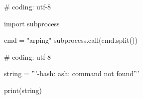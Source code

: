 \begin{mylisting}[label={lst:acpid},language=sh,caption=arping]
# coding: utf-8

import subprocess

cmd = "arping"
subprocess.call(cmd.split())

\end{mylisting}


\begin{mylisting}[label={lst:acpid},language=sh,caption=ash]
# coding: utf-8

string = '''-bash: ash: command not found'''

print(string)

\end{mylisting}

